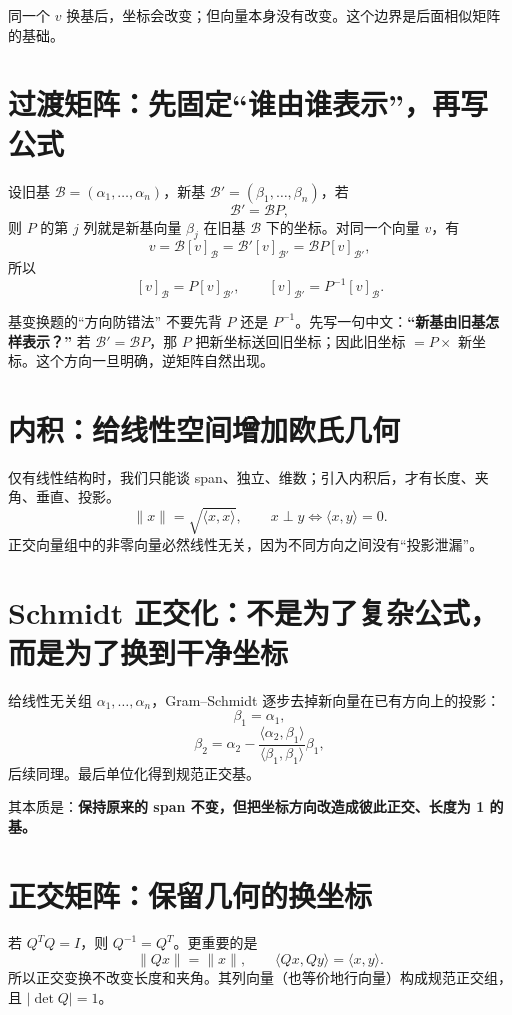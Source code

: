 \documentclass[11pt,a4paper,openany]{ctexbook}
\newcommand{\key}[1]{\textbf{\color{deep}#1}}
\begin{document}
同一个 $v$ 换基后，坐标会改变；但向量本身没有改变。这个边界是后面相似矩阵的基础。

\section{过渡矩阵：先固定“谁由谁表示”，再写公式}
设旧基 $\mathcal B=(\alpha_1,\dots,\alpha_n)$，新基 $\mathcal B'=(\beta_1,\dots,\beta_n)$，若
\[
\mathcal B'=\mathcal BP,
\]
则 $P$ 的第 $j$ 列就是新基向量 $\beta_j$ 在旧基 $\mathcal B$ 下的坐标。对同一个向量 $v$，有
\[
v=\mathcal B[v]_{\mathcal B}=\mathcal B'[v]_{\mathcal B'}=\mathcal BP[v]_{\mathcal B'},
\]
所以
\[
\boxed{[v]_{\mathcal B}=P[v]_{\mathcal B'},\qquad [v]_{\mathcal B'}=P^{-1}[v]_{\mathcal B}.}
\]

\begin{methodbox}{基变换题的“方向防错法”}
不要先背 $P$ 还是 $P^{-1}$。先写一句中文：\key{“新基由旧基怎样表示？”} 若 $\mathcal B'=\mathcal BP$，那 $P$ 把新坐标送回旧坐标；因此旧坐标 $=P\times$ 新坐标。这个方向一旦明确，逆矩阵自然出现。
\end{methodbox}

\section{内积：给线性空间增加欧氏几何}
仅有线性结构时，我们只能谈 span、独立、维数；引入内积后，才有长度、夹角、垂直、投影。
\[
\lVert x\rVert=\sqrt{\langle x,x\rangle},\qquad x\perp y\iff \langle x,y\rangle=0.
\]
正交向量组中的非零向量必然线性无关，因为不同方向之间没有“投影泄漏”。

\section{Schmidt 正交化：不是为了复杂公式，而是为了换到干净坐标}
给线性无关组 $\alpha_1,\dots,\alpha_n$，Gram--Schmidt 逐步去掉新向量在已有方向上的投影：
\[
\beta_1=\alpha_1,
\]
\[
\beta_2=\alpha_2-\frac{\langle\alpha_2,\beta_1\rangle}{\langle\beta_1,\beta_1\rangle}\beta_1,
\]
后续同理。最后单位化得到规范正交基。

其本质是：\key{保持原来的 span 不变，但把坐标方向改造成彼此正交、长度为 1 的基。}

\section{正交矩阵：保留几何的换坐标}
若 $Q^TQ=I$，则 $Q^{-1}=Q^T$。更重要的是
\[
\lVert Qx\rVert=\lVert x\rVert,\qquad \langle Qx,Qy\rangle=\langle x,y\rangle.
\]
所以正交变换不改变长度和夹角。其列向量（也等价地行向量）构成规范正交组，且 $\lvert\det Q\rvert=1$。
\end{document}
